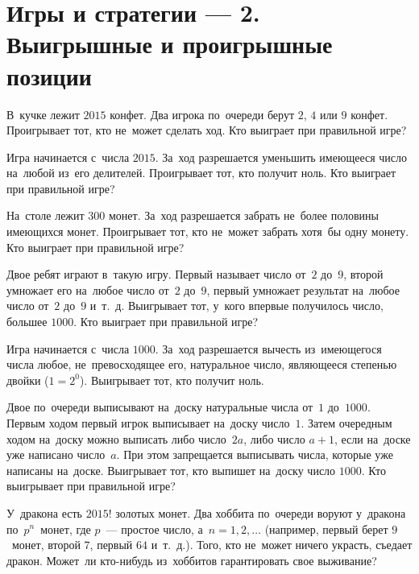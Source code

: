 
\section*{Игры и стратегии --- 2. Выигрышные и проигрышные позиции}


\begin{problems}

\item
В~кучке лежит $2015$ конфет.
Два игрока по~очереди берут $2$, $4$ или $9$ конфет.
Проигрывает тот, кто не~может сделать ход.
Кто выиграет при правильной игре?

\item
Игра начинается с~числа $2015$.
За~ход разрешается уменьшить имеющееся число на~любой из~его делителей.
Проигрывает тот, кто получит ноль.
Кто выиграет при правильной игре?

\item
На~столе лежит $300$ монет.
За~ход разрешается забрать не~более половины имеющихся монет.
Проигрывает тот, кто не~может забрать хотя~бы одну монету.
Кто выиграет при правильной игре?

\item
Двое ребят играют в~такую игру.
Первый называет число от~$2$ до~$9$, второй умножает его на~любое число
от~$2$ до~$9$, первый умножает результат на~любое число от~$2$ до~$9$ и~т.~д.
Выигрывает тот, у~кого впервые получилось число, большее $1000$.
Кто выиграет при правильной игре?

\item
Игра начинается с~числа $1000$.
За~ход разрешается вычесть из~имеющегося числа любое, не~превосходящее его,
натуральное число, являющееся степенью двойки ($1 = 2^0$).
Выигрывает тот, кто получит ноль.

\item
Двое по~очереди выписывают на~доску натуральные числа от~$1$ до~$1000$.
Первым ходом первый игрок выписывает на~доску число~$1$.
Затем очередным ходом на~доску можно выписать либо число~$2a$, либо
число $a + 1$, если на~доске уже написано число~$a$.
При этом запрещается выписывать числа, которые уже написаны на~доске.
Выигрывает тот, кто выпишет на~доску число $1000$.
Кто выигрывает при правильной игре?

\item
У~дракона есть $2015!$ золотых монет.
Два хоббита по~очереди воруют у~дракона по~$p^n$~монет, где $p$~--- простое
число, а~$n = 1, 2, \ldots$
(например, первый берет $9$~монет, второй $7$, первый $64$ и~т.~д.).
Того, кто не~может ничего украсть, съедает дракон.
Может~ли кто-нибудь из~хоббитов гарантировать свое выживание?

\end{problems}


